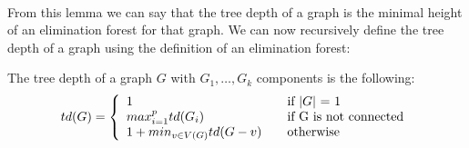 \paragraph{}
From this lemma we can say that the tree depth of a graph is the minimal height of an elimination forest for that graph. We can now recursively define the tree depth of a graph using the definition of an elimination forest:

\begin{definition}
The tree depth of a graph $G$ with $G_1, \ldots, G_k$ components is the following:
\[ td(G) = \left\{ 
  \begin{array}{l l}
    1 & \quad \text{if $\vert G\vert$ = 1}\\
    max^p_{i=1}td(G_i) & \quad \text{if G is not connected}\\
    1 + min_{v \in V(G)}td(G-v) & \quad \text{otherwise}
  \end{array} \right.\]
\end{definition} 
